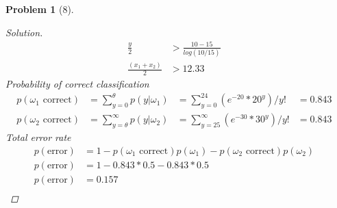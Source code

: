 \documentclass[11pt]{article}
\theoremstyle{quest}
\newtheorem*{problem}{Problem}
\newenvironment{solution}
  {\begin{mdframed}\begin{proof}[Solution]}
  {\end{proof}\end{mdframed}}
\begin{document}
\begin{problem}[8]
\begin{enumerate}[label=(\alph*)]
\begin{solution}
\begin{align*}
                    \frac{y}{2} &> \frac{10 - 15}{log(10 / 15)} &\\
                    \frac{(x_1 + x_2)}{2} &> 12.33
                \end{align*}
                Probability of correct classification
                \begin{align*}
                    p(\omega_1 \text{ correct}) &= \sum_{y=0}^\theta p(y|\omega_1) &= \sum_{y=0}^{24} (e^{-20} *20^y)/y! &= 0.843 &\\
                    p(\omega_2 \text{ correct}) &= \sum_{y=\theta}^\infty p(y|\omega_2) &= \sum_{y=25}^{\infty} (e^{-30} *30^y)/y! &= 0.843
                \end{align*}
                Total error rate
                \begin{align*}
                    p(\text{error}) &= 1 - p(\omega_1 \text{ correct})p(\omega_1) - p(\omega_2 \text{ correct})p(\omega_2) &\\
                    p(\text{error}) &= 1 - 0.843 * 0.5 - 0.843 * 0.5 &\\
                    p(\text{error}) &= 0.157 &\\
                \end{align*}
            \end{solution}
    \end{enumerate}
\end{problem}

\end{document}
